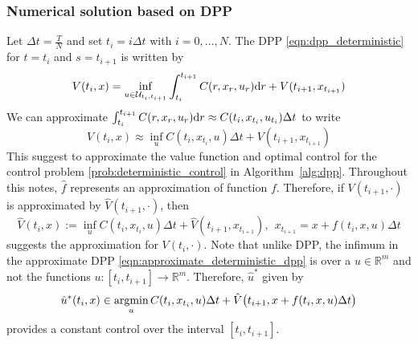 \documentclass[11pt]{book}
\newcommand{\dr}{\text{\normalfont d}r}
\begin{document}
\subsubsection{Numerical solution based on DPP}
Let $\Delta t = \frac{T}{N}$ and set $t_i=i\Delta t$ with $i=0,...,N$. The DPP \eqref{eqn:dpp_deterministic} for $t=t_i$ and $s=t_{i+1}$ is written by
\begin{equation}
    V(t_{i},x) =\inf_{u\in\mathcal{U}_{t_i,t_{i+1}}}\int_{t_i}^{t_{i+1}}C(r,x_r,u_r){{\dr}}+V(t_{i+1},x_{t_{i+1}})
\end{equation}
We can approximate $\int_{t_i}^{t_{i+1}}C(r,x_r,u_r){{\dr}}\approx C(t_i,x_{t_i},u_{t_i})\Delta t$ to write
\begin{equation}
    V(t_{i},x) \approx\inf_{u}C(t_{i},x_{t_{i}},u){{\Delta t}}+V(t_{i+1},x_{t_{i+1}})
\end{equation}
This suggest to approximate the value function and optimal control for the control problem \eqref{prob:deterministic_control} in Algorithm~\ref{alg:dpp}. Throughout this notes, $\hat{f}$ represents an approximation of function $f$. 
Therefore, if $V(t_{i+1},\cdot)$ is approximated by  $\hat{V}(t_{i+1},\cdot)$, then 
\begin{equation}\label{eqn:approximate_deterministic_dpp}
    \hat{V}(t_{i},x):=\inf_{u}C(t_{i},x_{t_{i}},u){{\Delta t}}+\hat{V}(t_{i+1},x_{t_{i+1}}),~~x_{t_{i+1}} = x + f(t_i,x,u)\Delta t 
\end{equation}
suggests the approximation for $V(t_{i},\cdot)$. Note that unlike DPP,  the infimum  in the approximate DPP \eqref{eqn:approximate_deterministic_dpp} is over a $u\in\mathbb{R}^m$ and not the functions $u:[t_i,t_{i+1}]\to\mathbb{R}^m$. Therefore, $\hat{u}^*$ given by 
\[
\hat{u}^*(t_i,x)\in\mathop{\text{\normalfont argmin}}_{u}C(t_{i},x_{t_{i}},u){{\Delta t}}+\hat{V}\big(t_{i+1},x + f(t_i,x,u)\Delta t\big)  
\]
provides a constant control over the interval $[t_i,t_{i+1}]$.
\end{document}
